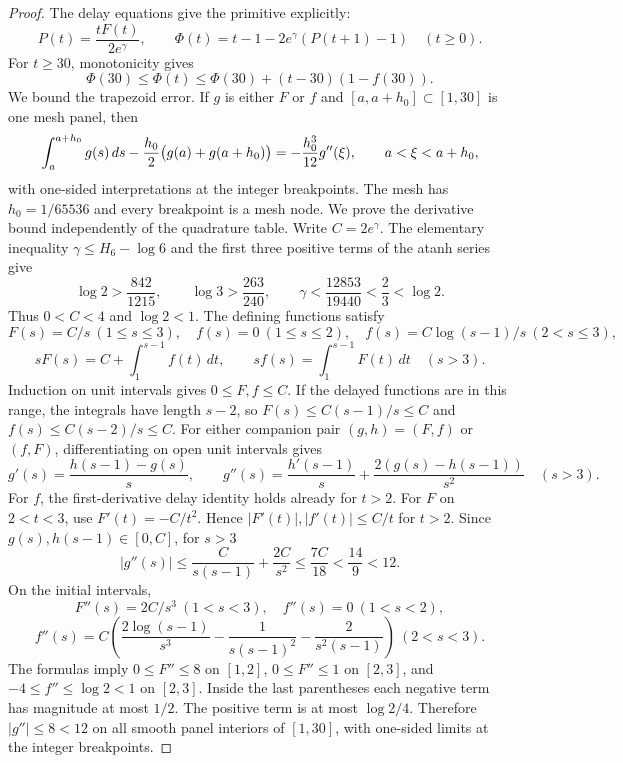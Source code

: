\begin{proof}
The delay equations give the primitive explicitly:
\begin{equation}\label{eq:app-Phi}
 P(t)=\frac{tF(t)}{2e^\gamma},\qquad
 \Phi(t)=t-1-2e^\gamma(P(t+1)-1)\quad(t\ge0).
\end{equation}
For \(t\ge30\), monotonicity gives
\begin{equation}\label{eq:app-Phi-tail}
 \Phi(30)\le\Phi(t)
 \le\Phi(30)+(t-30)(1-f(30)).
\end{equation}
We bound the trapezoid error. If $g$ is either $F$ or $f$ and
$[a,a+h_0]\subset[1,30]$ is one mesh panel, then
\begin{equation}\label{eq:app-trapezoid-remainder}
 \int_a^{a+h_0}g(s)\,ds-
 {h_0\over2}\bigl(g(a)+g(a+h_0)\bigr)
 =-{h_0^3\over12}g''(\xi),
 \qquad a<\xi<a+h_0,
\end{equation}
with one-sided interpretations at the integer breakpoints. The mesh has
$h_0=1/65536$ and every breakpoint is a mesh node. We prove the derivative
bound independently of the quadrature table. Write $C=2e^\gamma$. The
elementary inequality $\gamma\le H_6-\log6$ and the first three positive
terms of the atanh series give
\[
 \log2>\frac{842}{1215},\qquad \log3>\frac{263}{240},\qquad
 \gamma<\frac{12853}{19440}<\frac23<\log2.
\]
Thus $0<C<4$ and $\log2<1$. The defining functions satisfy
\[
 F(s)=C/s\ (1\le s\le3),\quad
 f(s)=0\ (1\le s\le2),\quad f(s)=C\log(s-1)/s\ (2<s\le3),
\]
\[
 sF(s)=C+\int_1^{s-1}f(t)\,dt,\qquad
 sf(s)=\int_1^{s-1}F(t)\,dt\quad(s>3).
\]
Induction on unit intervals gives $0\le F,f\le C$. If the delayed
functions are in this range, the integrals have length $s-2$, so
$F(s)\le C(s-1)/s\le C$ and $f(s)\le C(s-2)/s\le C$.
For either companion pair $(g,h)=(F,f)$ or $(f,F)$, differentiating on
open unit intervals gives
\[
 g'(s)=\frac{h(s-1)-g(s)}s,\qquad
 g''(s)=\frac{h'(s-1)}s+
        \frac{2(g(s)-h(s-1))}{s^2}\quad(s>3).
\]
For $f$, the first-derivative delay identity holds already for $t>2$.
For $F$ on $2<t<3$, use $F'(t)=-C/t^2$. Hence
$|F'(t)|,|f'(t)|\le C/t$ for $t>2$. Since $g(s),h(s-1)\in[0,C]$, for $s>3$
\[
 |g''(s)|\le\frac{C}{s(s-1)}+\frac{2C}{s^2}
 \le\frac{7C}{18}<\frac{14}{9}<12.
\]
On the initial intervals,
\[
 F''(s)=2C/s^3\ (1<s<3),\quad f''(s)=0\ (1<s<2),
\]
\[
 f''(s)=C\left(\frac{2\log(s-1)}{s^3}
       -\frac1{s(s-1)^2}-\frac2{s^2(s-1)}\right)\ (2<s<3).
\]
The formulas imply $0\le F''\le8$ on $[1,2]$,
$0\le F''\le1$ on $[2,3]$, and $-4\le f''\le\log2<1$ on $[2,3]$.
Inside the last parentheses each negative term has magnitude at most
$1/2$. The positive term is at most $\log2/4$. Therefore
$|g''|\le8<12$ on all smooth panel interiors of $[1,30]$, with one-sided
limits at the integer breakpoints.


\end{proof}
